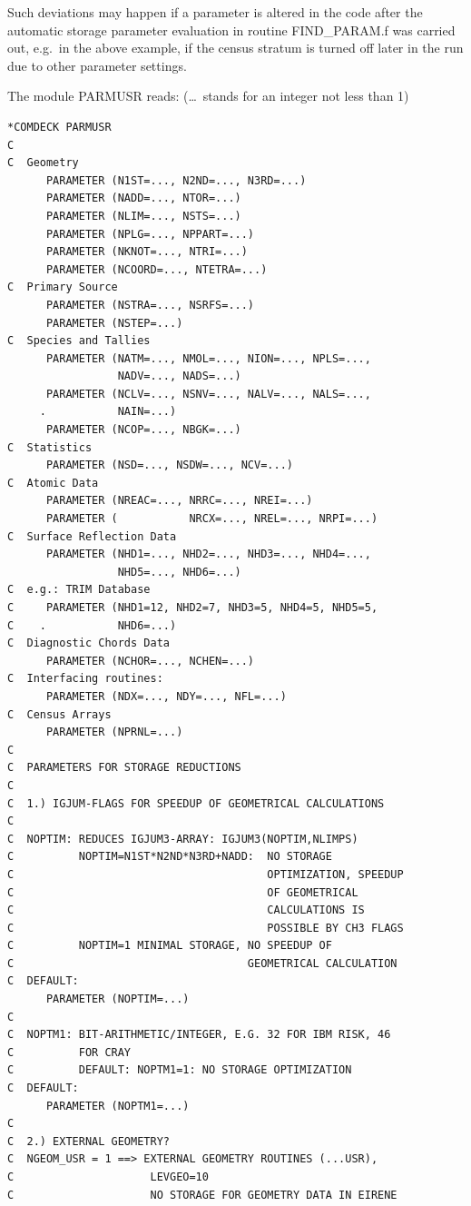 Such deviations may happen if a parameter is altered in the code after the
automatic storage parameter evaluation in routine FIND\_PARAM.f was carried
out, e.g.\ in the above example, if the census stratum is turned off later in
the run due to other parameter settings.

The module PARMUSR reads: (\dots\ stands for an integer not less than 1)

\begin{lstlisting}
*COMDECK PARMUSR
C
C  Geometry
      PARAMETER (N1ST=..., N2ND=..., N3RD=...)
      PARAMETER (NADD=..., NTOR=...)
      PARAMETER (NLIM=..., NSTS=...)
      PARAMETER (NPLG=..., NPPART=...)
      PARAMETER (NKNOT=..., NTRI=...)
      PARAMETER (NCOORD=..., NTETRA=...)
C  Primary Source
      PARAMETER (NSTRA=..., NSRFS=...)
      PARAMETER (NSTEP=...)
C  Species and Tallies
      PARAMETER (NATM=..., NMOL=..., NION=..., NPLS=...,
                 NADV=..., NADS=...)
      PARAMETER (NCLV=..., NSNV=..., NALV=..., NALS=..., 
     .           NAIN=...)
      PARAMETER (NCOP=..., NBGK=...)
C  Statistics
      PARAMETER (NSD=..., NSDW=..., NCV=...)
C  Atomic Data
      PARAMETER (NREAC=..., NRRC=..., NREI=...)
      PARAMETER (           NRCX=..., NREL=..., NRPI=...)
C  Surface Reflection Data
      PARAMETER (NHD1=..., NHD2=..., NHD3=..., NHD4=...,
                 NHD5=..., NHD6=...)
C  e.g.: TRIM Database
C     PARAMETER (NHD1=12, NHD2=7, NHD3=5, NHD4=5, NHD5=5, 
C    .           NHD6=...)
C  Diagnostic Chords Data
      PARAMETER (NCHOR=..., NCHEN=...)
C  Interfacing routines:
      PARAMETER (NDX=..., NDY=..., NFL=...)
C  Census Arrays
      PARAMETER (NPRNL=...)
C
C  PARAMETERS FOR STORAGE REDUCTIONS
C
C  1.) IGJUM-FLAGS FOR SPEEDUP OF GEOMETRICAL CALCULATIONS
C
C  NOPTIM: REDUCES IGJUM3-ARRAY: IGJUM3(NOPTIM,NLIMPS)
C          NOPTIM=N1ST*N2ND*N3RD+NADD:  NO STORAGE 
C                                       OPTIMIZATION, SPEEDUP 
C                                       OF GEOMETRICAL
C                                       CALCULATIONS IS
C                                       POSSIBLE BY CH3 FLAGS
C          NOPTIM=1 MINIMAL STORAGE, NO SPEEDUP OF
C                                    GEOMETRICAL CALCULATION
C  DEFAULT:
      PARAMETER (NOPTIM=...)
C
C  NOPTM1: BIT-ARITHMETIC/INTEGER, E.G. 32 FOR IBM RISK, 46 
C          FOR CRAY
C          DEFAULT: NOPTM1=1: NO STORAGE OPTIMIZATION
C  DEFAULT:
      PARAMETER (NOPTM1=...)
C
C  2.) EXTERNAL GEOMETRY?
C  NGEOM_USR = 1 ==> EXTERNAL GEOMETRY ROUTINES (...USR), 
C                     LEVGEO=10
C                     NO STORAGE FOR GEOMETRY DATA IN EIRENE

\end{lstlisting}
